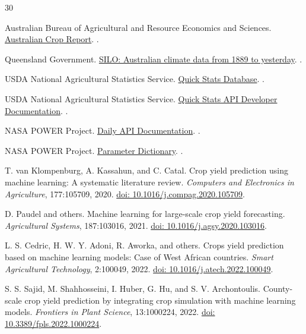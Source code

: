 \documentclass[11pt,a4paper]{article}
\begin{document}
\begin{thebibliography}{30}

Australian Bureau of Agricultural and Resource Economics and Sciences.
\newblock \href{https://www.agriculture.gov.au/abares/research-topics/agricultural-outlook/australian-crop-report}{Australian Crop Report}.
.

Queensland Government.
\newblock \href{https://www.longpaddock.qld.gov.au/silo/}{SILO: Australian climate data from 1889 to yesterday}.
.

USDA National Agricultural Statistics Service.
\newblock \href{https://www.nass.usda.gov/Quick_Stats/}{Quick Stats Database}.
.

USDA National Agricultural Statistics Service.
\newblock \href{https://www.nass.usda.gov/developer/}{Quick Stats API Developer Documentation}.
.

NASA POWER Project.
\newblock \href{https://power.larc.nasa.gov/docs/services/api/temporal/daily/}{Daily API Documentation}.
.

NASA POWER Project.
\newblock \href{https://power.larc.nasa.gov/docs/tutorials/parameters/}{Parameter Dictionary}.
.

T. van Klompenburg, A. Kassahun, and C. Catal.
\newblock Crop yield prediction using machine learning: A systematic literature review.
\newblock \emph{Computers and Electronics in Agriculture}, 177:105709, 2020.
\newblock \href{https://doi.org/10.1016/j.compag.2020.105709}{doi: 10.1016/j.compag.2020.105709}.

D. Paudel and others.
\newblock Machine learning for large-scale crop yield forecasting.
\newblock \emph{Agricultural Systems}, 187:103016, 2021.
\newblock \href{https://doi.org/10.1016/j.agsy.2020.103016}{doi: 10.1016/j.agsy.2020.103016}.

L. S. Cedric, H. W. Y. Adoni, R. Aworka, and others.
\newblock Crops yield prediction based on machine learning models: Case of West African countries.
\newblock \emph{Smart Agricultural Technology}, 2:100049, 2022.
\newblock \href{https://doi.org/10.1016/j.atech.2022.100049}{doi: 10.1016/j.atech.2022.100049}.

S. S. Sajid, M. Shahhosseini, I. Huber, G. Hu, and S. V. Archontoulis.
\newblock County-scale crop yield prediction by integrating crop simulation with machine learning models.
\newblock \emph{Frontiers in Plant Science}, 13:1000224, 2022.
\newblock \href{https://doi.org/10.3389/fpls.2022.1000224}{doi: 10.3389/fpls.2022.1000224}.


\end{thebibliography}
\end{document}
